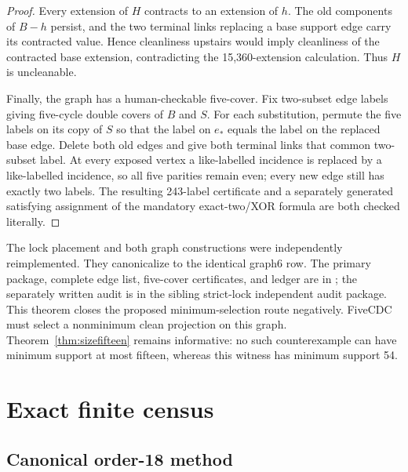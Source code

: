 \documentclass[11pt]{article}
\theoremstyle{definition}
\theoremstyle{remark}
\begin{document}
\begin{proof}
Every extension of \(H\) contracts to an extension of \(h\).  The old
components of \(B-h\) persist, and the two terminal links replacing a
base support edge carry its contracted value.  Hence cleanliness upstairs
would imply cleanliness of the contracted base extension, contradicting
the 15,360-extension calculation.  Thus \(H\) is uncleanable.

Finally, the graph has a human-checkable five-cover.  Fix two-subset
edge labels giving five-cycle double covers of \(B\) and \(S\).  For each
substitution, permute the five labels on its copy of \(S\) so that the
label on \(e_\ast\) equals the label on the replaced base edge.  Delete
both old edges and give both terminal links that common two-subset label.
At every exposed vertex a like-labelled incidence is replaced by a
like-labelled incidence, so all five parities remain even; every new edge
still has exactly two labels.  The resulting 243-label certificate and
a separately generated satisfying assignment of the mandatory
exact-two/XOR formula are both checked literally.
\end{proof}

The lock placement and both graph constructions were independently
reimplemented.  They canonicalize to the identical graph6 row.  The
primary package, complete edge list, five-cover certificates, and ledger
are in
\allowbreak
{};
the separately written audit is in the sibling strict-lock independent
audit package.
This theorem closes the proposed minimum-selection route negatively.
FiveCDC must select a nonminimum clean projection on this graph.
Theorem~\ref{thm:sizefifteen} remains informative: no such counterexample
can have minimum support at most fifteen, whereas this witness has minimum
support 54.

\section{Exact finite census}\label{sec:census}

\subsection{Canonical order-18 method}
\end{document}
